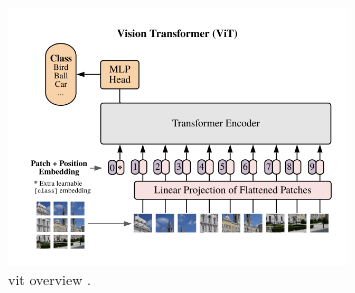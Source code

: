 \begin{figure}[t]
    \centering
    \includegraphics[width=0.8\textwidth]{fig/rel/images/vit_schema.png}
    \caption{\gls{vit} overview \autocite{dosovitskiy2020image}.}
    \label{fig:rel_vit}
\end{figure}